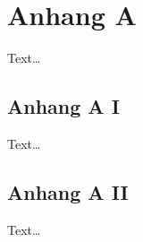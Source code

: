 \chapter{Anhang A}
\label{ch:app-A}

Text\dots

\section{Anhang A I}
\label{sec:app-AI}

Text\dots

\section{Anhang A II}
\label{sec:app-AII}

Text\dots